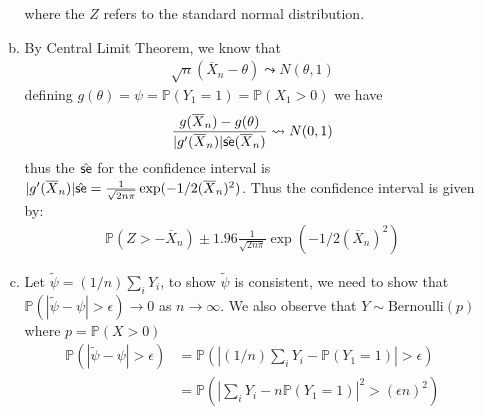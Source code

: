 \documentclass[a4paper,10pt]{article}
\theoremstyle{definition}
\begin{document}
\begin{enumerate}
\begin{enumerate}[(a)]
where the $Z$ refers to the standard normal distribution.
\item
By Central Limit Theorem, we know that 
\begin{align*}
\sqrt{n}(\overline{X}_n-\theta) \leadsto N(\theta, 1)
\end{align*}
defining $g(\theta) = \psi = \mathbb{P}(Y_1=1) = \mathbb{P}(X_1>0)$ we have
\begin{align*}
\frac{g(\overline{X}_n)-g(\theta)}{|g'(\overline{X}_n)|\hat{\text{\sffamily se}}(\overline{X}_n)}\leadsto N(0,1)
\end{align*} 
thus the $\hat{\text{\sffamily se}}$ for the confidence interval is $|g'(\overline{X}_n)|\hat{\text{\sffamily se}} = \frac{1}{\sqrt{2n\pi}}\exp (-1/2(\overline{X}_n)^2)$. Thus the confidence interval is given by:
\begin{align*}
\mathbb{P}\left( Z> -\overline{X}_n\right) \pm 1.96\frac{1}{\sqrt{2n\pi}}\exp (-1/2(\overline{X}_n)^2)
\end{align*}
\item Let $\tilde{\psi} = (1/n)\sum_iY_i$, to show $\tilde{\psi}$ is consistent, we need to show that $\mathbb{P}(|\tilde{\psi} - \psi|>\epsilon) \to 0$ as $n \to \infty$. We also observe that $Y\sim \text{Bernoulli}(p)$ where $p = \mathbb{P}(X>0)$
\begin{align*}
\mathbb{P}(|\tilde{\psi} - \psi|>\epsilon) &= \mathbb{P}(|(1/n)\sum_iY_i - \mathbb{P}(Y_1=1)|>\epsilon)\\
&=\mathbb{P}\left(\left|\sum_iY_i - n\mathbb{P}(Y_1=1)\right|^2>(\epsilon n)^2\right)\\

\end{align*}
\end{enumerate}
\end{enumerate}
\end{document}
